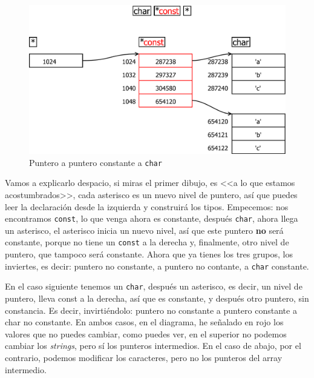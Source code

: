 \documentclass[a4paper]{article}
\begin{document}
\begin{figure}[H]
    \includegraphics[width=\linewidth]{char_pointer_const_pointer}
    \caption{Puntero a puntero constante a \texttt{char}}
    \label{img:charconstpointerpointer}
\end{figure}

Vamos a explicarlo despacio, si miras el primer dibujo, es <<a lo que estamos
acostumbrados>>, cada asterisco es un nuevo nivel de puntero, así que puedes
leer la declaración desde la izquierda y construirá los tipos. Empecemos:
nos encontramos \verb!const!, lo que venga ahora es constante, después
\verb!char!, ahora llega un asterisco, el asterisco inicia un nuevo nivel, así
que este puntero \textbf{no} será constante, porque no tiene un \verb!const!
a la derecha y, finalmente, otro nivel de puntero, que tampoco será constante.
Ahora que ya tienes los tres grupos, los inviertes, es decir: puntero no
constante, a puntero no contante, a \verb!char! constante.

En el caso siguiente tenemos un \verb!char!, después un asterisco, es decir,
un nivel de puntero, lleva const a la derecha, así que es constante, y después
otro puntero, sin constancia. Es decir, invirtiéndolo: puntero no constante a
puntero constante a char no constante. En ambos casos, en el diagrama, he
señalado en rojo los valores que no puedes cambiar, como puedes ver, en el
superior no podemos cambiar los \textit{strings}, pero sí los punteros
intermedios. En el caso de abajo, por el contrario, podemos modificar los
caracteres, pero no los punteros del array intermedio.
\end{document}
